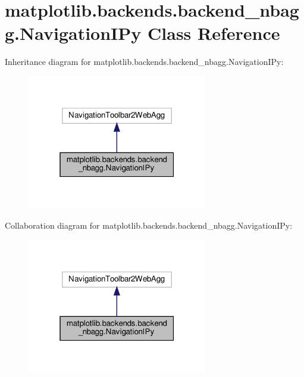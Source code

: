 \hypertarget{classmatplotlib_1_1backends_1_1backend__nbagg_1_1NavigationIPy}{}\section{matplotlib.\+backends.\+backend\+\_\+nbagg.\+Navigation\+I\+Py Class Reference}
\label{classmatplotlib_1_1backends_1_1backend__nbagg_1_1NavigationIPy}


Inheritance diagram for matplotlib.\+backends.\+backend\+\_\+nbagg.\+Navigation\+I\+Py\+:
\nopagebreak
\begin{figure}[H]
\begin{center}
\leavevmode
\includegraphics[width=223pt]{classmatplotlib_1_1backends_1_1backend__nbagg_1_1NavigationIPy__inherit__graph}
\end{center}
\end{figure}


Collaboration diagram for matplotlib.\+backends.\+backend\+\_\+nbagg.\+Navigation\+I\+Py\+:
\nopagebreak
\begin{figure}[H]
\begin{center}
\leavevmode
\includegraphics[width=223pt]{classmatplotlib_1_1backends_1_1backend__nbagg_1_1NavigationIPy__coll__graph}
\end{center}
\end{figure}
